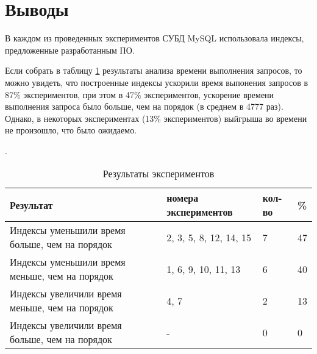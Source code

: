 \section{Выводы}

В каждом из проведенных экспериментов СУБД MySQL использовала индексы, предложенные разработанным ПО. 

Если собрать в таблицу \ref{table:list_experiments_result} результаты анализа времени выполнения запросов, то можно увидеть, что построенные индексы ускорили время выпонения запросов в 87\% экспериментов, при этом в 47\% экспериментов, ускорение времени выполнения запроса было больше, чем на порядок (в среднем в 4777 раз). Однако, в некоторых экспериментах (13\% экспериментов) выйгрыша во времени не произошло, что было ожидаемо.


\begin{table}[h]
\caption{Результаты экспериментов}\label{table:list_experiments_result}.
\medskip
\begin{tabular}{|p{6cm}|l|l|l|}
\hline
Результат & номера экспериментов & кол-во & \%\\
\hline
Индексы уменьшили время больше, чем на порядок & 2, 3, 5, 8, 12, 14, 15 & 7 & 47\\\hline
Индексы уменьшили время меньше, чем на порядок & 1, 6, 9, 10, 11, 13 & 6& 40 \\\hline
Индексы увеличили время меньше, чем на порядок & 4, 7 & 2& 13\\\hline
Индексы увеличили время больше, чем на порядок & - & 0& 0\\\hline

\end{tabular}
\end{table}
